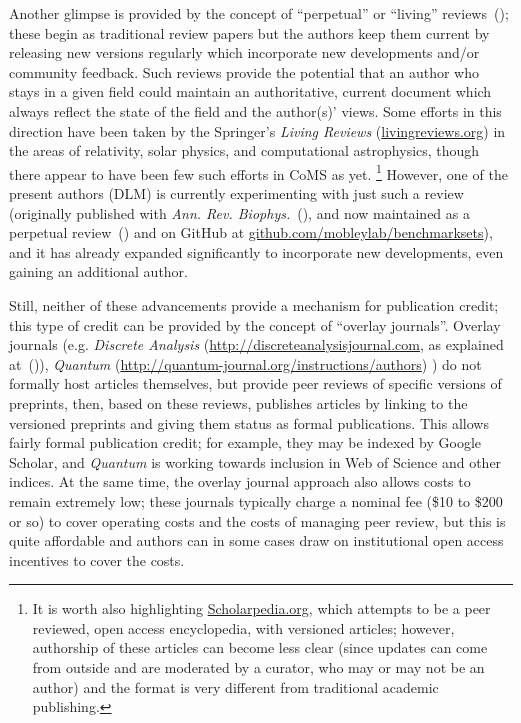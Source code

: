 \documentclass[9pt]{livecoms}
\begin{document}
Another glimpse is provided by the concept of ``perpetual'' or ``living'' reviews~(\cite{Mobley:2015:arXiv:1502.01329[cs]}); these begin as traditional review papers but the authors keep them current by releasing new versions regularly which incorporate new developments and/or community feedback.
Such reviews provide the potential that an author who stays in a given field could maintain an authoritative, current document which always reflect the state of the field and the author(s)' views. 
Some efforts in this direction have been taken by the Springer's \emph{Living Reviews} (\url{livingreviews.org}) in the areas of relativity, solar physics, and computational astrophysics, though there appear to have been few such efforts in CoMS as yet. 
\footnote{It is worth also highlighting \url{Scholarpedia.org}, which attempts to be a peer reviewed, open access encyclopedia, with versioned articles; however, authorship of these articles can become less clear (since updates can come from outside and are moderated by a curator, who may or may not be an author) and the format is very different from traditional academic publishing.}
However, one of the present authors (DLM) is currently experimenting with just such a review (originally published with \emph{Ann. Rev. Biophys.}~(\cite{Mobley:2017:AnnualReviewofBiophysics}), and now maintained as a perpetual review~(\cite{Mobley:2017:eScholarshipa}) and on GitHub at \url{github.com/mobleylab/benchmarksets}), and it has already expanded significantly to incorporate new developments, even gaining an additional author.

Still, neither of these advancements provide a mechanism for publication credit; this type of credit can be provided by the concept of ``overlay journals''.
Overlay journals (e.g. \emph{Discrete Analysis} (\url{http://discreteanalysisjournal.com}, as explained at~(\cite{:2015:Gowers'sWeblog})), \emph{Quantum} (\url{http://quantum-journal.org/instructions/authors}) ) do not formally host articles themselves, but provide peer reviews of specific versions of preprints, then, based on these reviews, publishes articles by linking to the versioned preprints and giving them status as formal publications.
This allows fairly formal publication credit; for example, they may be indexed by Google Scholar, and \emph{Quantum} is working towards inclusion in Web of Science and other indices. 
At the same time, the overlay journal approach also allows costs to remain extremely low; these journals typically charge a nominal fee (\$10 to \$200 or so) to cover operating costs and the costs of managing peer review, but this is quite affordable and authors can in some cases draw on institutional open access incentives to cover the costs. 
\end{document}
